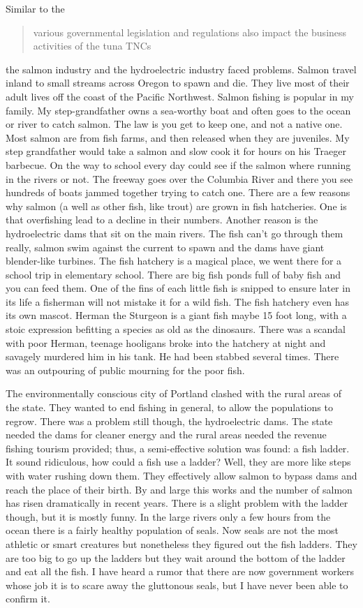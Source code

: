 \documentclass[
    a4paper,
    12pt,
    man,
    donotrepeattitle
]{apa6}
\let \cite \parencite
\begin{document}
Similar to the \blockquote{various governmental legislation and regulations 
also impact
the business activities of the tuna TNCs} \cite[p. 161]{s5} the salmon industry
and the
hydroelectric industry faced problems. Salmon travel inland to small streams
across Oregon to spawn and die. They live most of their adult lives off the
coast of the Pacific Northwest. Salmon fishing is popular in my family. My
step-grandfather owns a sea-worthy boat and often goes to the ocean or river to
catch salmon. The law is you get to keep one, and not a native one. Most salmon
are from fish farms, and then released when they are juveniles. My step
grandfather would take a salmon and slow cook it for hours on his Traeger
barbecue. On the way to school every day could see if the salmon where running
in the rivers or not. The freeway goes over the Columbia River and there you
see hundreds of boats jammed together trying to catch one. There are a few
reasons why salmon (a well as other fish, like trout) are grown in fish
hatcheries. One is that overfishing lead to a decline in their numbers. Another
reason is the hydroelectric dams that sit on the main rivers. The fish can't go
through them really, salmon swim against the current to spawn and the dams have
giant blender-like turbines. The fish hatchery is a magical place, we went
there for a school trip in elementary school. There are big fish ponds full of
baby fish and you can feed them. One of the fins of each little fish is snipped
to ensure later in its life a fisherman will not mistake it for a wild fish.
The fish hatchery even has its own mascot. Herman the Sturgeon is a giant fish
maybe 15 foot long, with a stoic expression befitting a species as old as the
dinosaurs. There was a scandal with poor Herman, teenage hooligans broke into
the hatchery at night and savagely murdered him in his tank. He had been
stabbed several times. There was an outpouring of public mourning for the poor
fish.

The environmentally conscious city of Portland clashed with the rural areas of
the state. They wanted to end fishing in general, to allow the populations to
regrow. There was a problem still though, the hydroelectric dams. The state
needed the dams for cleaner energy and the rural areas needed the revenue
fishing tourism provided; thus, a semi-effective solution was found: a fish
ladder. It sound ridiculous, how could a fish use a ladder? Well, they are more
like steps with water rushing down them. They effectively allow salmon to
bypass dams and reach the place of their birth. By and large this works and the
number of salmon has risen dramatically in recent years. There is a slight
problem with the ladder though, but it is mostly funny. In the large rivers
only a few hours from the ocean there is a fairly healthy population of seals.
Now seals are not the most athletic or smart creatures but nonetheless they
figured out the fish ladders. They are too big to go up the ladders but they
wait around the bottom of the ladder and eat all the fish. I have heard a rumor
that there are now government workers whose job it is to scare away the
gluttonous seals, but I have never been able to confirm it.
\end{document}
